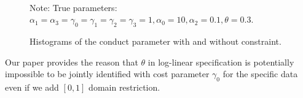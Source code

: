 \documentclass[11pt, a4paper]{article}
\begin{document}
\begin{figure}[!htbp]
  \begin{center}
  \\
  \caption{Histograms of the conduct parameter with and without constraint.}
  \label{fg:histogram_loglinear_loglinear_with_constraint} 
  \end{center}
  \footnotesize
  Note: True parameters: $\alpha_1 = \alpha_3 = \gamma_0 = \gamma_1 = \gamma_2  = \gamma_3 = 1, \alpha_0 = 10, \alpha_2 = 0.1,  \theta = 0.3.$
\end{figure}










Our paper provides the reason that $\theta$ in log-linear specification is potentially impossible to be jointly identified with cost parameter $\gamma_0$ for the specific data even if we add $[0,1]$ domain restriction. 
\end{document}
